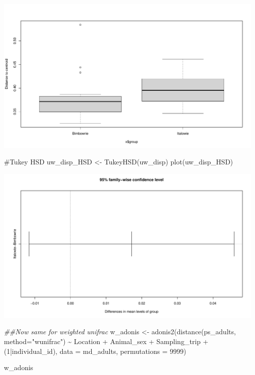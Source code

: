 \documentclass[
  letterpaper,
  DIV=11,
  numbers=noendperiod]{scrartcl}
\newenvironment{Shaded}{\begin{snugshade}}{\end{snugshade}}
\newcommand{\AttributeTok}[1]{\textcolor[rgb]{0.40,0.45,0.13}{#1}}
\newcommand{\CommentTok}[1]{\textcolor[rgb]{0.37,0.37,0.37}{#1}}
\newcommand{\DecValTok}[1]{\textcolor[rgb]{0.68,0.00,0.00}{#1}}
\newcommand{\DocumentationTok}[1]{\textcolor[rgb]{0.37,0.37,0.37}{\textit{#1}}}
\newcommand{\FunctionTok}[1]{\textcolor[rgb]{0.28,0.35,0.67}{#1}}
\newcommand{\NormalTok}[1]{\textcolor[rgb]{0.00,0.23,0.31}{#1}}
\newcommand{\OtherTok}[1]{\textcolor[rgb]{0.00,0.23,0.31}{#1}}
\newcommand{\SpecialCharTok}[1]{\textcolor[rgb]{0.37,0.37,0.37}{#1}}
\newcommand{\StringTok}[1]{\textcolor[rgb]{0.13,0.47,0.30}{#1}}
\begin{document}
\includegraphics{code_files/figure-pdf/unnamed-chunk-5-3.pdf}

\begin{Shaded}
\begin{Highlighting}[]
\CommentTok{\#Tukey HSD}
\NormalTok{uw\_disp\_HSD }\OtherTok{\textless{}{-}} \FunctionTok{TukeyHSD}\NormalTok{(uw\_disp)}
\FunctionTok{plot}\NormalTok{(uw\_disp\_HSD)}
\end{Highlighting}
\end{Shaded}

\includegraphics{code_files/figure-pdf/unnamed-chunk-5-4.pdf}

\begin{Shaded}
\begin{Highlighting}[]
\DocumentationTok{\#\#Now same for weighted unifrac}
\NormalTok{w\_adonis }\OtherTok{\textless{}{-}} \FunctionTok{adonis2}\NormalTok{(}\FunctionTok{distance}\NormalTok{(ps\_adults, }\AttributeTok{method=}\StringTok{"wunifrac"}\NormalTok{) }\SpecialCharTok{\textasciitilde{}}\NormalTok{ Location }\SpecialCharTok{+}\NormalTok{ Animal\_sex }\SpecialCharTok{+}\NormalTok{ Sampling\_trip }\SpecialCharTok{+}\NormalTok{ (}\DecValTok{1}\SpecialCharTok{|}\NormalTok{individual\_id), }\AttributeTok{data =}\NormalTok{ md\_adults, }\AttributeTok{permutations =} \DecValTok{9999}\NormalTok{)}

\NormalTok{w\_adonis}
\end{Highlighting}
\end{Shaded}
\end{document}
